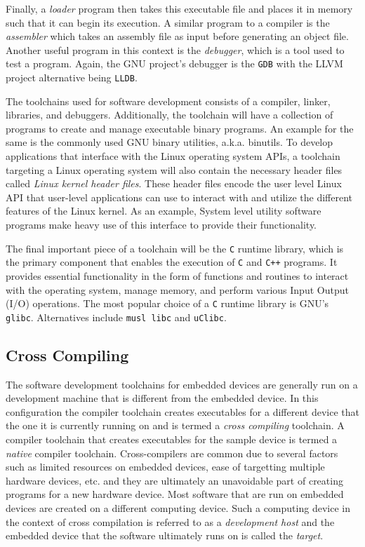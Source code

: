 Finally, a \textit{loader} program then takes this executable file and places it in memory such that it can begin its execution. A similar program to a compiler is the \textit{assembler} which takes an assembly file as input before generating an object file. Another useful program in this context is the \textit{debugger}, which is a tool used to test a program. Again, the GNU project's debugger is the \texttt{GDB} with the LLVM project alternative being \texttt{LLDB}.

The toolchains used for software development consists of a compiler, linker, libraries, and debuggers. Additionally, the toolchain will have a collection of programs to create and manage executable binary programs. An example for the same is the commonly used GNU binary utilities, a.k.a. binutils. To develop applications that interface with the Linux operating system APIs, a toolchain targeting a Linux operating system will also contain the necessary header files called \textit{Linux kernel header files}. These header files encode the user level Linux API that user-level applications can use to interact with and utilize the different features of the Linux kernel. As an example, System level utility software programs make heavy use of this interface to provide their functionality.

The final important piece of a toolchain will be the \texttt{C} runtime library, which is the primary component that enables the execution of \texttt{C} and \texttt{C++} programs. It provides essential functionality in the form of functions and routines to interact with the operating system, manage memory, and perform various Input Output (I/O) operations. The most popular choice of a \texttt{C} runtime library is GNU's \texttt{glibc}. Alternatives include \texttt{musl libc} and \texttt{uClibc}.

\subsection{Cross Compiling}

The software development toolchains for embedded devices are generally run on a development machine that is different from the embedded device. In this configuration the compiler toolchain creates executables for a different device that the one it is currently running on and is termed a \textit{cross compiling} toolchain. A compiler toolchain that creates executables for the sample device is termed a \textit{native} compiler toolchain. Cross-compilers are common due to several factors such as limited resources on embedded devices, ease of targetting multiple hardware devices, etc. and they are ultimately an unavoidable part of creating programs for a new hardware device. Most software that are run on embedded devices are created on a different computing device. Such a computing device in the context of cross compilation is referred to as a \textit{development host} and the embedded device that the software ultimately runs on is called the \textit{target}.

